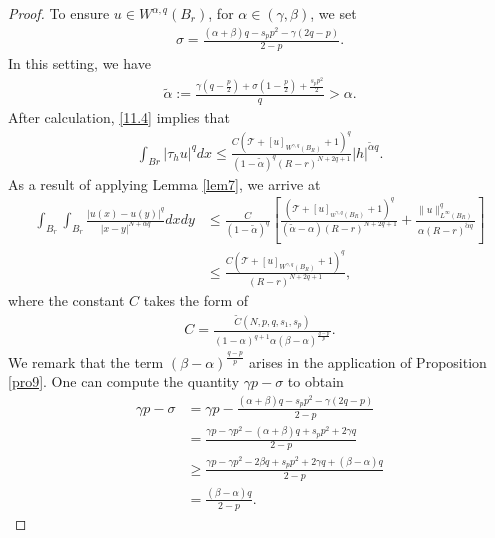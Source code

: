 \documentclass[reqno,10pt]{amsart}
\numberwithin{equation}{section}
\begin{document}
\begin{proof}
	To ensure $u \in W^{\alpha, q}\left(B_r\right)$, for $\alpha\in(\gamma,\beta)$, we set 
	\begin{align*}
		\sigma=\frac{(\alpha+\beta)q-s_pp^2-\gamma(2q-p)}{2-p}.
	\end{align*}
	In this setting, we have 
	\begin{align*}
		\tilde{\alpha}:=\frac{\gamma\left(q-\frac{p}{2}\right)+\sigma\left(1-\frac{p}{2}\right)+\frac{s_p p^2}{2}}{q}>\alpha.
	\end{align*}
	After calculation, \eqref{11.4} implies that
	\begin{align*}
		\int_{B r}\left|\tau_h u\right|^q d x \leq \frac{C\left(\mathcal{T}+[u]_{W^{\gamma,q}\left(B_R\right)}+1\right)^q}{(1-\tilde{\alpha})^q(R-r)^{N+2 q+1} }|h|^{\tilde{\alpha} q}.
	\end{align*}
	As a result of applying Lemma \ref{lem7}, we arrive at 
	\begin{align}
		\label{11.5}
		\int_{B_r} \int_{B_r} \frac{|u(x)-u(y)|^q}{|x-y|^{N+\alpha q}} d x d y & \leq \frac{C}{(1-\tilde{\alpha})^q}\left[\frac{\left(\mathcal{T}+[u]_{w^{\gamma, q}\left(B_R\right)}+1\right)^q}{(\tilde{\alpha}-\alpha)(R-r)^{N+2 q+1} }+\frac{\|u\|_{L^{\infty}\left(B_R\right)}^q}{\alpha(R-r)^{\tilde{\alpha} q}}\right] \nonumber\\
		& \leq \frac{C\left(\mathcal{T}+[u]_{W^{\gamma, q}\left(B_R\right)}+1\right)^q}{(R-r)^{N+2q+1} },
	\end{align}
	where the constant $C$ takes the form of 
	\begin{align*}
		C=\frac{\widetilde{C}\left(N, p, q, s_1, s_p\right)}{(1-\alpha)^{q+1}  \alpha(\beta-\alpha)^{\frac{q-p}{p}}}.
	\end{align*}
	We remark that the term $(\beta-\alpha)^{\frac{q-p}{p}}$ arises in the application of Proposition \ref{pro9}.
	One can compute the quantity $\gamma p-\sigma$ to obtain
	\begin{align*}
		\gamma p-\sigma&=\gamma p-\frac{(\alpha+\beta)q-s_pp^2-\gamma(2q-p)}{2-p}\\
		&=\frac{\gamma p-\gamma p^2-(\alpha+\beta)q+s_pp^2+2\gamma q}{2-p}\\
		&\ge \frac{\gamma p-\gamma p^2-2\beta q+s_pp^2+2\gamma q+(\beta-\alpha)q}{2-p}\\
		&=\frac{(\beta-\alpha)q}{2-p}.
	\end{align*}
\end{proof}
\end{document}
